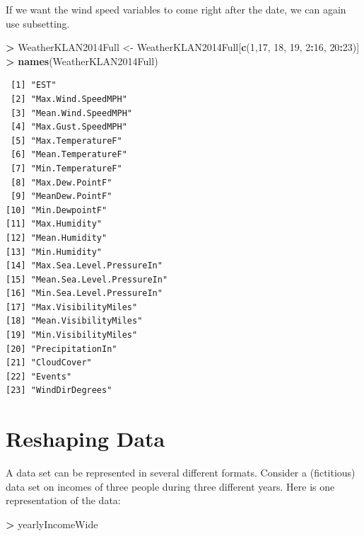 \documentclass[
]{krantz}
\makeatletter
\newenvironment{Shaded}{\begin{snugshade}}{\end{snugshade}}
\newcommand{\DecValTok}[1]{\textcolor[rgb]{0.06,0.06,0.06}{#1}}
\newcommand{\KeywordTok}[1]{\textcolor[rgb]{0.27,0.27,0.27}{\textbf{#1}}}
\newcommand{\NormalTok}[1]{#1}
\newcommand{\OperatorTok}[1]{\textcolor[rgb]{0.43,0.43,0.43}{\textbf{#1}}}
\newcommand{\StringTok}[1]{\textcolor[rgb]{0.5,0.5,0.5}{#1}}
\newenvironment{kframe}{%
\medskip{}
\setlength{\fboxsep}{.8em}
 \def\at@end@of@kframe{}%
 \ifinner\ifhmode%
  \def\at@end@of@kframe{\end{minipage}}%
  \begin{minipage}{\columnwidth}%
 \fi\fi%
 \def\FrameCommand##1{\hskip\@totalleftmargin \hskip-\fboxsep
 \colorbox{shadecolor}{##1}\hskip-\fboxsep
     \hskip-\linewidth \hskip-\@totalleftmargin \hskip\columnwidth}%
 \MakeFramed {\advance\hsize-\width
   \@totalleftmargin\z@ \linewidth\hsize
   \@setminipage}}%
 {\par\unskip\endMakeFramed%
 \at@end@of@kframe}
\renewenvironment{Shaded}{\begin{kframe}}{\end{kframe}}
\makeatother
\begin{document}
If we want the wind speed variables to come right after the date, we can again use subsetting.

\begin{Shaded}
\begin{Highlighting}[]
\OperatorTok{\textgreater{}}\StringTok{ }\NormalTok{WeatherKLAN2014Full \textless{}{-}}\StringTok{ }\NormalTok{WeatherKLAN2014Full[}\KeywordTok{c}\NormalTok{(}\DecValTok{1}\NormalTok{,}\DecValTok{17}\NormalTok{, }\DecValTok{18}\NormalTok{, }\DecValTok{19}\NormalTok{, }\DecValTok{2}\OperatorTok{:}\DecValTok{16}\NormalTok{, }\DecValTok{20}\OperatorTok{:}\DecValTok{23}\NormalTok{)]}
\OperatorTok{\textgreater{}}\StringTok{ }\KeywordTok{names}\NormalTok{(WeatherKLAN2014Full)}
\end{Highlighting}
\end{Shaded}

\begin{verbatim}
 [1] "EST"                      
 [2] "Max.Wind.SpeedMPH"        
 [3] "Mean.Wind.SpeedMPH"       
 [4] "Max.Gust.SpeedMPH"        
 [5] "Max.TemperatureF"         
 [6] "Mean.TemperatureF"        
 [7] "Min.TemperatureF"         
 [8] "Max.Dew.PointF"           
 [9] "MeanDew.PointF"           
[10] "Min.DewpointF"            
[11] "Max.Humidity"             
[12] "Mean.Humidity"            
[13] "Min.Humidity"             
[14] "Max.Sea.Level.PressureIn" 
[15] "Mean.Sea.Level.PressureIn"
[16] "Min.Sea.Level.PressureIn" 
[17] "Max.VisibilityMiles"      
[18] "Mean.VisibilityMiles"     
[19] "Min.VisibilityMiles"      
[20] "PrecipitationIn"          
[21] "CloudCover"               
[22] "Events"                   
[23] "WindDirDegrees"           
\end{verbatim}

\hypertarget{reshaping-data}{%
\section{Reshaping Data}\label{reshaping-data}}

A data set can be represented in several different formats. Consider a (fictitious) data set on incomes of three people during three different years. Here is one representation of the data:

\begin{Shaded}
\begin{Highlighting}[]
\OperatorTok{\textgreater{}}\StringTok{ }\NormalTok{yearlyIncomeWide}
\end{Highlighting}
\end{Shaded}
\end{document}
